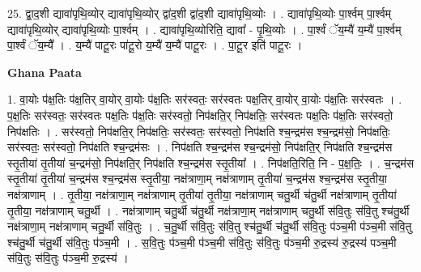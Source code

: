 \documentclass[17pt]{extarticle}
\begin{document}
25. द्वा॒द॒शी द्यावा॑पृथि॒व्योर् द्यावा॑पृथि॒व्योर् द्वा॑द॒शी द्वा॑द॒शी द्यावा॑पृथि॒व्योः । . द्यावा॑पृथि॒व्योः पा॒र्श्वम् पा॒र्श्वम् द्यावा॑पृथि॒व्योर् द्यावा॑पृथि॒व्योः पा॒र्श्वम् । . द्यावा॑पृथि॒व्योरिति॒ द्यावा᳚ - पृ॒थि॒व्योः । . पा॒र्श्वं ॅय॒म्यै॑ य॒म्यै॑ पा॒र्श्वम् पा॒र्श्वं ॅय॒म्यै᳚ । . य॒म्यै॑ पाटू॒रः पा॑टू॒रो य॒म्यै॑ य॒म्यै॑ पाटू॒रः । . पा॒टू॒र इति॑ पाटू॒रः । \newline

\textbf{Ghana Paata } \newline

1. वा॒योः प॑क्ष॒तिः प॑क्ष॒तिर् वा॒योर् वा॒योः प॑क्ष॒तिः सर॑स्वतः॒ सर॑स्वतः पक्ष॒तिर् वा॒योर् वा॒योः प॑क्ष॒तिः सर॑स्वतः । . प॒क्ष॒तिः सर॑स्वतः॒ सर॑स्वतः पक्ष॒तिः प॑क्ष॒तिः सर॑स्वतो॒ निप॑क्षति॒र् निप॑क्षतिः॒ सर॑स्वतः पक्ष॒तिः प॑क्ष॒तिः सर॑स्वतो॒ निप॑क्षतिः । . सर॑स्वतो॒ निप॑क्षति॒र् निप॑क्षतिः॒ सर॑स्वतः॒ सर॑स्वतो॒ निप॑क्षति श्च॒न्द्रम॑स श्च॒न्द्रम॑सो॒ निप॑क्षतिः॒ सर॑स्वतः॒ सर॑स्वतो॒ निप॑क्षति श्च॒न्द्रम॑सः । . निप॑क्षति श्च॒न्द्रम॑स श्च॒न्द्रम॑सो॒ निप॑क्षति॒र् निप॑क्षति श्च॒न्द्रम॑स स्तृ॒तीया॑ तृ॒तीया॑ च॒न्द्रम॑सो॒ निप॑क्षति॒र् निप॑क्षति श्च॒न्द्रम॑स स्तृ॒तीया᳚ । . निप॑क्षति॒रिति॒ नि - प॒क्ष॒तिः॒ । . च॒न्द्रम॑स स्तृ॒तीया॑ तृ॒तीया॑ च॒न्द्रम॑स श्च॒न्द्रम॑स स्तृ॒तीया॒ नक्ष॑त्राणा॒म् नक्ष॑त्राणाम् तृ॒तीया॑ च॒न्द्रम॑स श्च॒न्द्रम॑स स्तृ॒तीया॒ नक्ष॑त्राणाम् । . तृ॒तीया॒ नक्ष॑त्राणा॒म् नक्ष॑त्राणाम् तृ॒तीया॑ तृ॒तीया॒ नक्ष॑त्राणाम् चतु॒र्थी च॑तु॒र्थी नक्ष॑त्राणाम् तृ॒तीया॑ तृ॒तीया॒ नक्ष॑त्राणाम् चतु॒र्थी । . नक्ष॑त्राणाम् चतु॒र्थी च॑तु॒र्थी नक्ष॑त्राणा॒म् नक्ष॑त्राणाम् चतु॒र्थी स॑वि॒तुः स॑वि॒तु श्च॑तु॒र्थी नक्ष॑त्राणा॒म् नक्ष॑त्राणाम् चतु॒र्थी स॑वि॒तुः । . च॒तु॒र्थी स॑वि॒तुः स॑वि॒तु श्च॑तु॒र्थी च॑तु॒र्थी स॑वि॒तुः प॑ञ्च॒मी प॑ञ्च॒मी स॑वि॒तु श्च॑तु॒र्थी च॑तु॒र्थी स॑वि॒तुः प॑ञ्च॒मी । . स॒वि॒तुः प॑ञ्च॒मी प॑ञ्च॒मी स॑वि॒तुः स॑वि॒तुः प॑ञ्च॒मी रु॒द्रस्य॑ रु॒द्रस्य॑ पञ्च॒मी स॑वि॒तुः स॑वि॒तुः प॑ञ्च॒मी रु॒द्रस्य॑ । \newline
\end{document}
